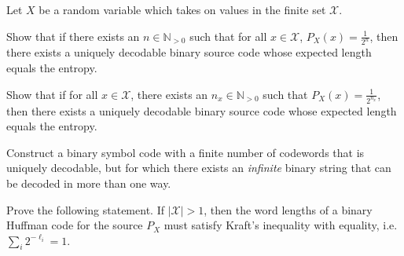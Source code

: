 \documentclass[a4paper,10pt,landscape,twocolumn]{scrartcl}
\begin{document}
\begin{exercise}
Let $X$ be a random variable which takes on values in the finite set $\mathcal{X}$.
	\begin{subex}
	Show that if there exists an $n \in \mathbb{N}_{>0}$ such that for
        all $x \in \mathcal{X}$, $P_X(x) = \frac{1}{2^n}$, then there
        exists a uniquely decodable binary source code whose expected length equals the entropy.
	\end{subex}
	\begin{subex}
        Show that if for all $x \in \mathcal{X}$, there exists an $n_x \in \mathbb{N}_{>0}$ such that $P_X(x) = \frac{1}{2^{n_x}}$, then there exists a uniquely decodable binary source code whose expected length equals the entropy.
	\end{subex}
\end{exercise}

\begin{bonusexercise}
Construct a binary symbol code with a finite number of codewords that is uniquely decodable, but for which there exists an \emph{infinite} binary string that can be decoded in more than one way.
\end{bonusexercise}

\begin{exercise}
Prove the following statement. 
If $|\mathcal{X}| >1$, then the word lengths of a binary Huffman code for the source $P_X$ must satisfy Kraft's inequality with equality, i.e. $\sum_i 2^{-\ell_i} = 1$.
\end{exercise}
\end{document}
